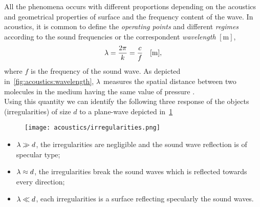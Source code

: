 All the phenomena occurs with different proportions depending on the acoustics and geometrical properties of surface and the frequency content of the wave.
In acoustics, it is common to define the \textit{operating points} and different \textit{regimes}
according to the sound frequencies or the correspondent \textit{wavelength} $[\si{\metre}]$,
\begin{equation}
    \lambda = \frac{2 \pi}{k} = \frac{c}{f} \hspace{1em} [\si{\metre}]
    ,
\end{equation}
where $f$ is the frequency of the sound wave.
As depicted in~\cref{fig:acoustics:wavelength}, $\lambda$ measures the spatial distance between two molecules in the medium having the same value of pressure
.
\\Using this quantity we can identify the following three response of the objects (irregularities) of size $d$ to a plane-wave depicted in~\cref{fig:acoustics:irregularities}
\begin{figure}
    \centering
    \footnotesize
    \texttt{[image: acoustics/irregularities.png]}
    \label{fig:acoustics:irregularities}
\end{figure}
\begin{itemize}
    \item $\lambda \gg d$, the irregularities are negligible and the sound wave reflection is of specular type;
    \item $\lambda \approx d$, the irregularities break the sound waves which is reflected towards every direction;
    \item $\lambda \ll d$, each irregularities is a surface reflecting specularly the sound waves.
\end{itemize}


